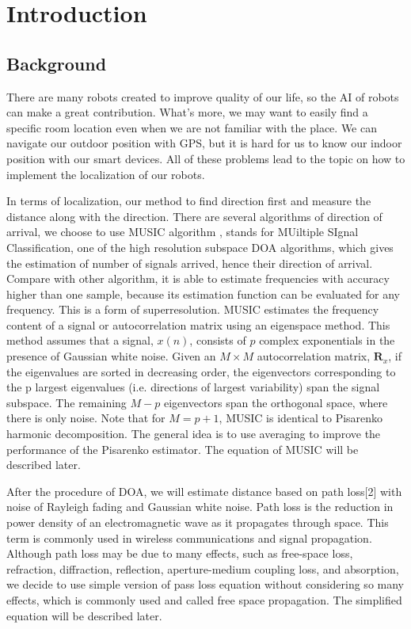 \section{Introduction}
\label{sec:introduction}
\subsection{Background}
	There are many robots created to improve quality of our life, so the AI of robots can make a great contribution. What's more, we may want to easily find a specific room location even when we are not familiar with the place. We can navigate our outdoor position with GPS, but it is hard for us to know our indoor position with our smart devices. All of these problems lead to the topic on how to implement the localization of our robots.
\par
	In terms of localization, our method to find direction first and measure the distance along with the direction. There are several algorithms of direction of arrival, we choose to use MUSIC algorithm , stands for MUiltiple SIgnal Classification, one of the high resolution subspace DOA algorithms, which gives the estimation of number of signals arrived, hence their direction of arrival. Compare with other algorithm, it is able to estimate frequencies with accuracy higher than one sample, because its estimation function can be evaluated for any frequency. This is a form of superresolution. MUSIC estimates the frequency content of a signal or autocorrelation matrix using an eigenspace method. This method assumes that a signal, $x(n)$, consists of $p$ complex exponentials in the presence of Gaussian white noise. Given an $M \times M$ autocorrelation matrix, $\mathbf{R}_x$, if the eigenvalues are sorted in decreasing order, the eigenvectors corresponding to the p largest eigenvalues (i.e. directions of largest variability) span the signal subspace. The remaining $M-p$ eigenvectors span the orthogonal space, where there is only noise. Note that for $M = p + 1$, MUSIC is identical to Pisarenko harmonic decomposition. The general idea is to use averaging to improve the performance of the Pisarenko estimator. The equation of MUSIC will be described later. \cite{wiki:MUSIC}%
\par
	After the procedure of DOA, we will estimate distance based on path loss[2] with noise of Rayleigh fading and Gaussian white noise. Path loss is the reduction in power density of an electromagnetic wave as it propagates through space. This term is commonly used in wireless communications and signal propagation. Although path loss may be due to many effects, such as free-space loss, refraction, diffraction, reflection, aperture-medium coupling loss, and absorption, we decide to use simple version of pass loss equation without considering so many effects, which is commonly used and called free space propagation. The simplified equation will be described later.
